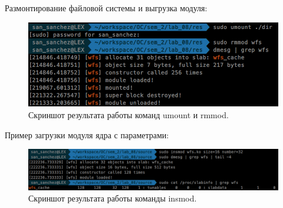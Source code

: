 Размонтирование файловой системы и выгрузка модуля:
\begin{figure}[H]
    \centering
    \includegraphics[scale=0.37]{data/image/9.png}
    \caption{Скриншот результата работы команд umount и rmmod.}
\end{figure}

Пример загрузки модуля ядра с параметрами:
\begin{figure}[H]
    \centering
    \includegraphics[scale=0.37]{data/image/10.png}
    \caption{Скриншот результата работы команды insmod.}
\end{figure}
